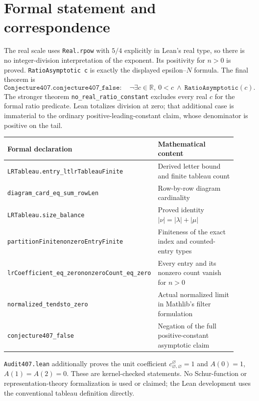 \documentclass[11pt]{article}
\newcommand{\R}{\mathbb R}
\begin{document}
\section{Formal statement and correspondence}
The real scale uses \texttt{Real.rpow} with $5/4$ explicitly in Lean's real
type, so there is no integer-division interpretation of the exponent. Its positivity for $n>0$ is proved.
\texttt{RatioAsymptotic c} is exactly the displayed epsilon--$N$ formula.
The final theorem is
\[
 \texttt{Conjecture407.conjecture407\_false}:\quad
 \neg\exists c\in\R,\ 0<c\ \land\ \texttt{RatioAsymptotic}(c).
\]
The stronger theorem \texttt{no\_real\_ratio\_constant} excludes every real
$c$ for the formal ratio predicate. Lean totalizes division at zero; that
additional case is immaterial to the ordinary positive-leading-constant
claim, whose denominator is positive on the tail.

\begin{center}\small
\begin{tabular}{@{}p{0.47\linewidth}p{0.46\linewidth}@{}}
\toprule
Formal declaration & Mathematical content\\
\midrule
\texttt{LRTableau.entry\_lt}\newline \texttt{lrTableauFinite}
 & Derived letter bound and finite tableau count\\
\texttt{diagram\_card\_eq\_sum\_rowLen}
 & Row-by-row diagram cardinality\\
\texttt{LRTableau.size\_balance}
 & Proved identity $|\nu|=|\lambda|+|\mu|$\\
\texttt{partitionFinite}\newline \texttt{nonzeroEntryFinite}
 & Finiteness of the exact index and counted-entry types\\
\texttt{lrCoefficient\_eq\_zero}\newline \texttt{nonzeroCount\_eq\_zero}
 & Every entry and its nonzero count vanish for $n>0$\\
\texttt{normalized\_tendsto\_zero}
 & Actual normalized limit in Mathlib's filter formulation\\
\texttt{conjecture407\_false}
 & Negation of the full positive-constant asymptotic claim\\
\bottomrule
\end{tabular}
\end{center}
\texttt{Audit407.lean} additionally proves the unit coefficient
$c^{\varnothing}_{\varnothing,\varnothing}=1$ and $A(0)=1$, $A(1)=A(2)=0$.
These are kernel-checked statements. No Schur-function or representation-theory
formalization is used or claimed; the Lean development uses the conventional
tableau definition directly.
\end{document}
